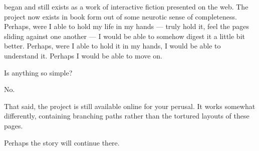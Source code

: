 \label{afterword}
\begin{paracol}{2}
\begin{leftcolumn}
   began and still exists as a work of interactive fiction presented on the web. The project now exists in book form out of some neurotic sense of completeness. Perhaps, were I able to hold my life in my hands --- truly hold it, feel the pages sliding against one another --- I would be able to somehow digest it a little bit better. Perhaps, were I able to hold it in my hands, I would be able to understand it. Perhaps I would be able to move on.

  \begin{ally}
    Is anything so simple?
  \end{ally}
  No.

  That said, the project is still available online for your perusal. It works somewhat differently, containing branching paths rather than the tortured layouts of these pages.

  Perhaps the story will continue there.


\end{leftcolumn}
\end{paracol}
